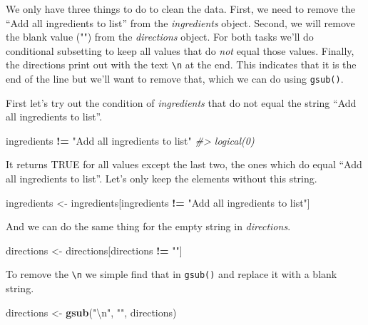 \documentclass[
  12pt,
]{book}
\newenvironment{Shaded}{\begin{snugshade}}{\end{snugshade}}
\newcommand{\CharTok}[1]{\textcolor[rgb]{0.5,0.5,0.5}{#1}}
\newcommand{\CommentTok}[1]{\textcolor[rgb]{0.37,0.37,0.37}{\textit{#1}}}
\newcommand{\KeywordTok}[1]{\textcolor[rgb]{0.27,0.27,0.27}{\textbf{#1}}}
\newcommand{\NormalTok}[1]{#1}
\newcommand{\OperatorTok}[1]{\textcolor[rgb]{0.43,0.43,0.43}{\textbf{#1}}}
\newcommand{\StringTok}[1]{\textcolor[rgb]{0.5,0.5,0.5}{#1}}
\begin{document}
We only have three things to do to clean the data. First, we need to remove the ``Add all ingredients to list'' from the \emph{ingredients} object. Second, we will remove the blank value ("") from the \emph{directions} object. For both tasks we'll do conditional subsetting to keep all values that do \emph{not} equal those values. Finally, the directions print out with the text \texttt{\textbackslash{}n} at the end. This indicates that it is the end of the line but we'll want to remove that, which we can do using \texttt{gsub()}.

First let's try out the condition of \emph{ingredients} that do not equal the string ``Add all ingredients to list''.

\begin{Shaded}
\begin{Highlighting}[]
\NormalTok{ingredients }\OperatorTok{!=}\StringTok{ "Add all ingredients to list"}
\CommentTok{\#> logical(0)}
\end{Highlighting}
\end{Shaded}

It returns TRUE for all values except the last two, the ones which do equal ``Add all ingredients to list''. Let's only keep the elements without this string.

\begin{Shaded}
\begin{Highlighting}[]
\NormalTok{ingredients <{-}}\StringTok{ }\NormalTok{ingredients[ingredients }\OperatorTok{!=}\StringTok{ "Add all ingredients to list"}\NormalTok{]}
\end{Highlighting}
\end{Shaded}

And we can do the same thing for the empty string in \emph{directions}.

\begin{Shaded}
\begin{Highlighting}[]
\NormalTok{directions <{-}}\StringTok{ }\NormalTok{directions[directions }\OperatorTok{!=}\StringTok{ ""}\NormalTok{]}
\end{Highlighting}
\end{Shaded}

To remove the \texttt{\textbackslash{}n} we simple find that in \texttt{gsub()} and replace it with a blank string.

\begin{Shaded}
\begin{Highlighting}[]
\NormalTok{directions <{-}}\StringTok{ }\KeywordTok{gsub}\NormalTok{(}\StringTok{"}\CharTok{\textbackslash{}n}\StringTok{"}\NormalTok{, }\StringTok{""}\NormalTok{, directions)}
\end{Highlighting}
\end{Shaded}
\end{document}
